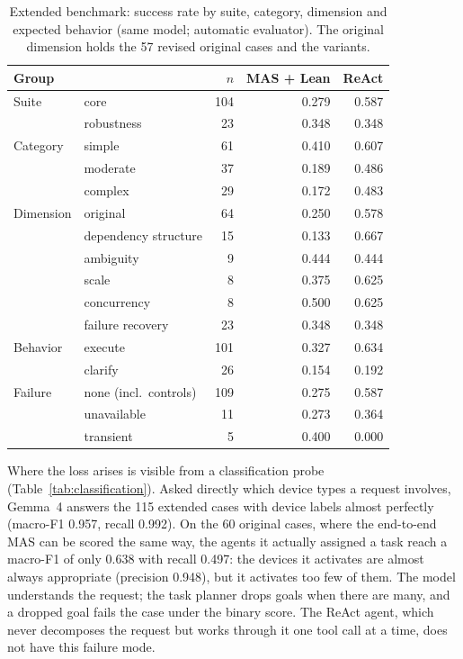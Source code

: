 \documentclass[a4paper,11pt]{article}
\begin{document}
\begin{table}[htbp]
  \centering
  \small
  \caption{Extended benchmark: success rate by suite, category, dimension and expected behavior
    (same model; automatic evaluator). The original dimension holds the 57 revised original cases
    and the variants.}
  \label{tab:dexa-breakdown}
  \begin{tabular}{llrrr}
    \toprule
    Group & & $n$ & MAS + Lean & ReAct \\
    \midrule
    Suite       & core                 & 104 & 0.279 & 0.587 \\
                & robustness           & 23  & 0.348 & 0.348 \\
    \midrule
    Category    & simple               & 61  & 0.410 & 0.607 \\
                & moderate             & 37  & 0.189 & 0.486 \\
                & complex              & 29  & 0.172 & 0.483 \\
    \midrule
    Dimension   & original             & 64  & 0.250 & 0.578 \\
                & dependency structure & 15  & 0.133 & 0.667 \\
                & ambiguity            & 9   & 0.444 & 0.444 \\
                & scale                & 8   & 0.375 & 0.625 \\
                & concurrency          & 8   & 0.500 & 0.625 \\
                & failure recovery     & 23  & 0.348 & 0.348 \\
    \midrule
    Behavior    & execute              & 101 & 0.327 & 0.634 \\
                & clarify              & 26  & 0.154 & 0.192 \\
    \midrule
    Failure     & none (incl.\ controls) & 109 & 0.275 & 0.587 \\
                & unavailable          & 11  & 0.273 & 0.364 \\
                & transient            & 5   & 0.400 & 0.000 \\
    \bottomrule
  \end{tabular}
\end{table}

Where the loss arises is visible from a classification probe (Table~\ref{tab:classification}).
Asked directly which device types a request involves, Gemma~4 answers the 115 extended cases
with device labels almost perfectly (macro-F1 0.957, recall 0.992). On the 60 original cases,
where the end-to-end MAS can be scored the same way, the agents it actually assigned a task reach
a macro-F1 of only 0.638 with recall 0.497: the devices it activates are almost always appropriate
(precision 0.948), but it activates too few of them. The model understands the request; the task
planner drops goals when there are many, and a dropped goal fails the case under the binary
score. The ReAct agent, which never decomposes the request but works through it one tool call at
a time, does not have this failure mode.
\end{document}

